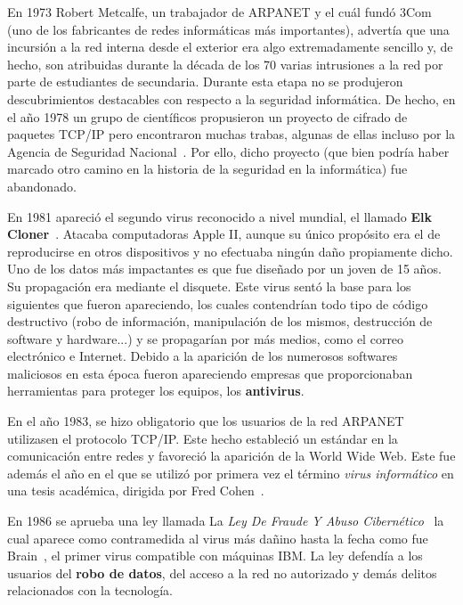 En 1973 Robert Metcalfe, un trabajador de ARPANET y el cuál fundó 3Com (uno de los fabricantes de redes informáticas más importantes), advertía que una incursión a la red interna desde el exterior era algo extremadamente sencillo y, de hecho, son atribuidas durante la década de los 70 varias intrusiones a la red por parte de estudiantes de secundaria. 
Durante esta etapa no se produjeron descubrimientos destacables con respecto a la seguridad informática. De hecho, en el año 1978 un grupo de científicos propusieron un proyecto de cifrado de paquetes TCP/IP pero encontraron muchas trabas, algunas de ellas incluso por la Agencia de Seguridad Nacional~\cite{article:nsa_tcp}. Por ello, dicho proyecto (que bien podría haber marcado otro camino en la historia de la seguridad en la informática) fue abandonado. 

En 1981 apareció el segundo virus reconocido a nivel mundial, el llamado \textbf{Elk Cloner}~\cite{article:cloner}. Atacaba computadoras Apple II, aunque su único propósito era el de reproducirse en otros dispositivos y no efectuaba ningún daño propiamente dicho. Uno de los datos más impactantes es que fue diseñado por un joven de 15 años. Su propagación era mediante el disquete. 
Este virus sentó la base para los siguientes que fueron apareciendo, los cuales contendrían todo tipo de código destructivo (robo de información, manipulación de los mismos, destrucción de software y hardware...) y se propagarían por más medios, como el correo electrónico e Internet.
Debido a la aparición de los numerosos softwares maliciosos en esta época fueron apareciendo empresas que proporcionaban herramientas para proteger los equipos, los \textbf{antivirus}.

En el año 1983, se hizo obligatorio que los usuarios de la red ARPANET utilizasen el protocolo TCP/IP. Este hecho estableció un estándar en la comunicación entre redes y favoreció la aparición de la World Wide Web.
Este fue además el año en el que se utilizó por primera vez el término \textit{virus informático} en una tesis académica, dirigida por Fred Cohen~\cite{article:cohen}.

En 1986 se aprueba una ley llamada La \textit{Ley De Fraude Y Abuso Cibernético}~\cite{article:ley} la cual aparece como contramedida al virus más dañino hasta la fecha como fue Brain~\cite{article:brain}, el primer virus compatible con máquinas IBM. La ley defendía a los usuarios del \textbf{robo de datos}, del acceso a la red no autorizado y demás delitos relacionados con la tecnología.


